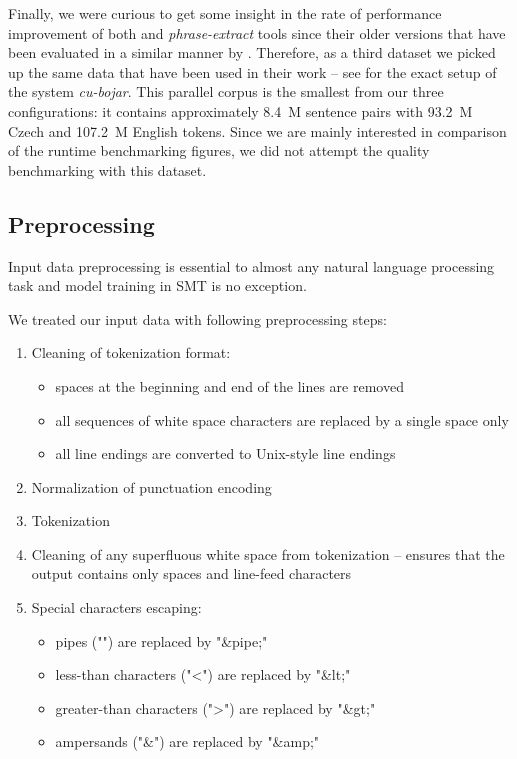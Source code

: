 Finally, we were curious to get some insight in the rate of performance improvement
of both \eppex{} and \emph{phrase-extract} tools since their older versions that have
been evaluated in a similar manner by \citet{przywara:eppex}.
Therefore, as a third dataset we picked up the same data that have been used in their
work -- see \citet{marecek:twostep} for the exact setup of the system \emph{cu-bojar}.
This parallel corpus is the smallest from our three configurations: it contains
approximately 8.4~M sentence pairs with 93.2~M Czech and 107.2~M English tokens.
Since we are mainly interested in comparison of the runtime benchmarking figures,
we did not attempt the quality benchmarking with this dataset.

\subsection{Preprocessing}

Input data preprocessing is essential to almost any natural language processing task
and model training in SMT is no exception.

We treated our input data with following preprocessing steps:
\begin{enumerate}
  \item Cleaning of tokenization format:
  \begin{itemize}
    \item spaces at the beginning and end of the lines are removed
    \item all sequences of white space characters are replaced by a single space only
    \item all line endings are converted to Unix-style line endings
  \end{itemize}
  \item Normalization of punctuation encoding
  \item Tokenization
  \item Cleaning of any superfluous white space from tokenization -- ensures that the output contains only spaces and line-feed characters
  \item Special characters escaping:
  \begin{itemize}
    \item pipes ("\textbar") are replaced by "\&pipe;"
    \item less-than characters ("<") are replaced by "\&lt;"
    \item greater-than characters (">") are replaced by "\&gt;"
    \item ampersands ("\&") are replaced by "\&amp;"
  \end{itemize}
\end{enumerate}

